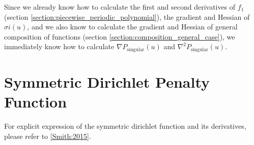 \noindent Since we already know how to calculate the first and second derivatives of $f_1$ (section \ref{section:piecewise_periodic_polynomial}),  the gradient and Hessian of $\sigma{i}\left(u\right)$, and we also know to calculate the gradient and Hessian of general composition of functions (section \ref{section:composition_general_case}), we immediately know how to calculate $\nabla P_{\mathrm{singular}}\left(u\right)$ and $\nabla^2 P_{\mathrm{singular}}\left(u\right)$.

\section{Symmetric Dirichlet Penalty Function}
For explicit expression of the symmetric dirichlet function and its derivatives, please refer to \ref{Smith:2015}.